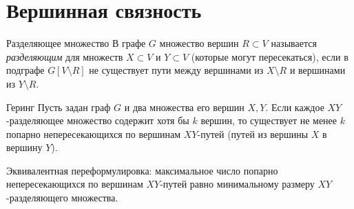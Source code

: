 
\section{Вершинная связность}

\begin{Definition}{Разделяющее множество}{}
	В графе $G$ множество вершин $R \subset V$ называется
	\emph{разделяющим} для множеств $X \subset V$ и $Y \subset V$
	(которые могут пересекаться), если в подграфе $G[V \setminus R]$
	не существует пути между вершинами из $X \setminus R$
	и вершинами из $Y \setminus R$.
\end{Definition}

\begin{Theorem}{Геринг}{}
	Пусть задан граф $G$ и два множества его вершин $X, Y$.
	Если каждое $XY$-разделяющее множество содержит хотя бы $k$ вершин,
	то существует не менее $k$ попарно непересекающихся по вершинам
	$XY$-путей (путей из вершины $X$ в вершину $Y$).
\end{Theorem}

\begin{Statement}{}{}
	Эквивалентная переформулировка: максимальное число попарно
	непересекающихся по вершинам $XY$-путей равно минимальному
	размеру $XY$-разделяющего множества.
\end{Statement}

